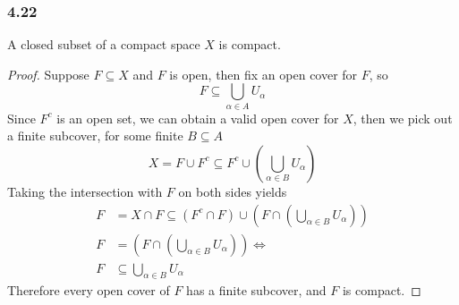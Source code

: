 \documentclass[../../main.tex]{subfiles}
\begin{document}
\subsubsection*{4.22}
\begin{wts}
A closed subset of a compact space $X$ is compact.
\end{wts}
\begin{proof}
Suppose $F\subseteq X$ and $F$ is open, then fix an open cover for $F$, so
\[
F\subseteq \bigcup_{\alpha\in A}U_\alpha
\]
Since $F^c$ is an open set, we can obtain a valid open cover for $X$, then we pick out a finite subcover, for some finite $B\subseteq A$
\[
X = F\cup F^c \subseteq F^c\cup \left(\bigcup_{\alpha\in B}U_\alpha\right)
\]
Taking the intersection with $F$ on both sides yields
\begin{align*}
    F &= X\cap F \subseteq (F^c\cap F)\cup \left(F\cap\left(\bigcup_{\alpha\in B}U_\alpha\right)\right)\\
    F &= \left(F\cap\left(\bigcup_{\alpha\in B}U_\alpha\right)\right)\iff\\
    F&\subseteq \bigcup_{\alpha\in B}U_\alpha
\end{align*}
Therefore every open cover of $F$ has a finite subcover, and $F$ is compact.
\end{proof}
\end{document}
